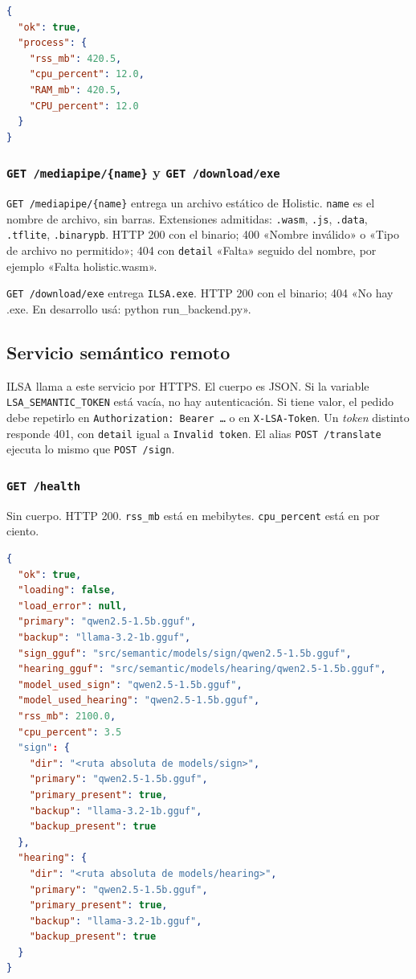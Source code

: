 \begin{lstlisting}[language=json]
{
  "ok": true,
  "process": {
    "rss_mb": 420.5,
    "cpu_percent": 12.0,
    "RAM_mb": 420.5,
    "CPU_percent": 12.0
  }
}
\end{lstlisting}

\subsubsection{\texttt{GET /mediapipe/\{name\}} y \texttt{GET /download/exe}}

\texttt{GET /mediapipe/\{name\}} entrega un archivo estático de Holistic. \texttt{name} es el nombre de archivo, sin barras. Extensiones admitidas: \texttt{.wasm}, \texttt{.js}, \texttt{.data}, \texttt{.tflite}, \texttt{.binarypb}. HTTP 200 con el binario; 400 «Nombre inválido» o «Tipo de archivo no permitido»; 404 con \texttt{detail} «Falta» seguido del nombre, por ejemplo «Falta holistic.wasm».

\texttt{GET /download/exe} entrega \texttt{ILSA.exe}. HTTP 200 con el binario; 404 «No hay .exe. En desarrollo usá: python run\_backend.py».

\subsection{Servicio semántico remoto}
\label{sec:contrato-api-semantico}

ILSA llama a este servicio por HTTPS. El cuerpo es JSON. Si la variable \texttt{LSA\_SEMANTIC\_TOKEN} está vacía, no hay autenticación. Si tiene valor, el pedido debe repetirlo en \texttt{Authorization: Bearer \ldots} o en \texttt{X-LSA-Token}. Un \textit{token} distinto responde 401, con \texttt{detail} igual a \texttt{Invalid token}. El alias \texttt{POST /translate} ejecuta lo mismo que \texttt{POST /sign}.

\subsubsection{\texttt{GET /health}}

Sin cuerpo. HTTP 200. \texttt{rss\_mb} está en mebibytes. \texttt{cpu\_percent} está en por ciento.

\begin{lstlisting}[language=json]
{
  "ok": true,
  "loading": false,
  "load_error": null,
  "primary": "qwen2.5-1.5b.gguf",
  "backup": "llama-3.2-1b.gguf",
  "sign_gguf": "src/semantic/models/sign/qwen2.5-1.5b.gguf",
  "hearing_gguf": "src/semantic/models/hearing/qwen2.5-1.5b.gguf",
  "model_used_sign": "qwen2.5-1.5b.gguf",
  "model_used_hearing": "qwen2.5-1.5b.gguf",
  "rss_mb": 2100.0,
  "cpu_percent": 3.5
  "sign": {
    "dir": "<ruta absoluta de models/sign>",
    "primary": "qwen2.5-1.5b.gguf",
    "primary_present": true,
    "backup": "llama-3.2-1b.gguf",
    "backup_present": true
  },
  "hearing": {
    "dir": "<ruta absoluta de models/hearing>",
    "primary": "qwen2.5-1.5b.gguf",
    "primary_present": true,
    "backup": "llama-3.2-1b.gguf",
    "backup_present": true
  }
}
\end{lstlisting}

